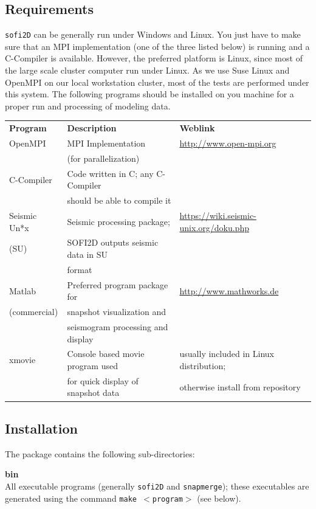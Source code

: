 \documentclass[11pt,english,a4paper]{article}
\begin{document}
\subsection{Requirements}
\label{requirements}
\texttt{sofi2D} can be generally run under Windows and Linux. You just have to make sure that an MPI implementation (one of the three listed below) is running and a C-Compiler is available. However, the preferred platform is Linux, since most of the large scale cluster computer run under Linux. As we use Suse Linux and OpenMPI on our local workstation cluster, most of the tests are performed under this system. The following programs should be installed on you machine for a proper run and processing of modeling data.\par
\begin{center}
\small
\begin{tabular}{lll}
\textbf{Program} & \textbf{Description} & \textbf{Weblink} \\ 
OpenMPI & MPI Implementation & \url{http://www.open-mpi.org} \\
& (for parallelization) & \\
C-Compiler & Code written in C; any C-Compiler & \\
& should be able to compile it & \\
Seismic Un*x & Seismic processing package; & \url{https://wiki.seismic-unix.org/doku.php} \\
(SU)  & SOFI2D outputs seismic data in SU & \\
& format & \\
Matlab & Preferred program package for & \url{http://www.mathworks.de} \\
(commercial)& snapshot visualization and  & \\
& seismogram processing and display & \\
xmovie & Console based movie program used & usually included in Linux distribution;\\
& for quick display of snapshot data & otherwise install from repository\\
\end{tabular}
\end{center}

\subsection{Installation}
\label{insta}
The package contains the following sub-directories:

\textbf{bin}\\
All executable programs (generally \texttt{sofi2D} and \texttt{snapmerge}); these executables are generated using the command \texttt{make $<$program$>$} (see below).
\end{document}
